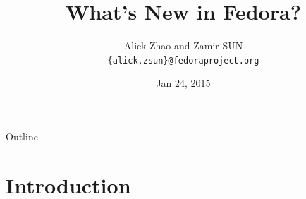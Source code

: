 \documentclass{beamer}
\title{What's New in Fedora?}
\author[alick \& zsun] %
{Alick Zhao and Zamir SUN\\ \texttt{\{alick,zsun\}@fedoraproject.org}}
\date[Fedora 21 Release Party] %
{Jan 24, 2015}
\begin{document}
\begin{frame}
  \titlepage
\end{frame}

\begin{frame}{Outline}
  \tableofcontents
\end{frame}




\section{Introduction}


\end{document}

